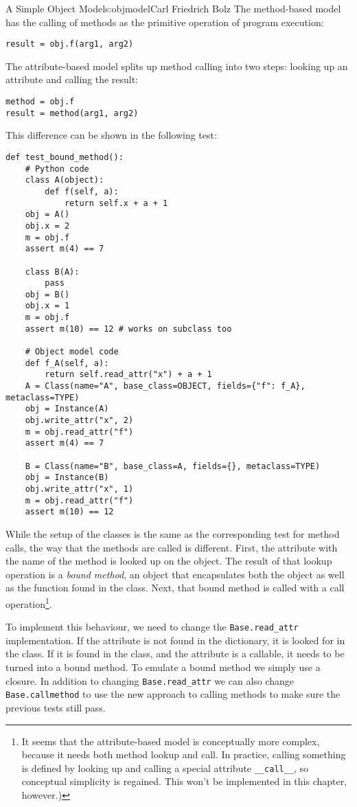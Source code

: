 \begin{aosachapter}{A Simple Object Model}{s:objmodel}{Carl Friedrich Bolz}
The method-based model has the calling of methods as the primitive
operation of program execution:

\begin{verbatim}
result = obj.f(arg1, arg2)
\end{verbatim}

The attribute-based model splits up method calling into two steps:
looking up an attribute and calling the result:

\begin{verbatim}
method = obj.f
result = method(arg1, arg2)
\end{verbatim}

This difference can be shown in the following test:

\begin{verbatim}
def test_bound_method():
    # Python code
    class A(object):
        def f(self, a):
            return self.x + a + 1
    obj = A()
    obj.x = 2
    m = obj.f
    assert m(4) == 7

    class B(A):
        pass
    obj = B()
    obj.x = 1
    m = obj.f
    assert m(10) == 12 # works on subclass too

    # Object model code
    def f_A(self, a):
        return self.read_attr("x") + a + 1
    A = Class(name="A", base_class=OBJECT, fields={"f": f_A}, metaclass=TYPE)
    obj = Instance(A)
    obj.write_attr("x", 2)
    m = obj.read_attr("f")
    assert m(4) == 7

    B = Class(name="B", base_class=A, fields={}, metaclass=TYPE)
    obj = Instance(B)
    obj.write_attr("x", 1)
    m = obj.read_attr("f")
    assert m(10) == 12
\end{verbatim}

While the setup of the classes is the same as the corresponding test for
method calls, the way that the methods are called is different. First,
the attribute with the name of the method is looked up on the object.
The result of that lookup operation is a \emph{bound method}, an object
that encapsulates both the object as well as the function found in the
class. Next, that bound method is called with a call operation\footnote{It
  seems that the attribute-based model is conceptually more complex,
  because it needs both method lookup and call. In practice, calling
  something is defined by looking up and calling a special attribute
  \texttt{\_\_call\_\_}, so conceptual simplicity is regained. This
  won't be implemented in this chapter, however.)}.

To implement this behaviour, we need to change the
\texttt{Base.read\_attr} implementation. If the attribute is not found
in the dictionary, it is looked for in the class. If it is found in the
class, and the attribute is a callable, it needs to be turned into a
bound method. To emulate a bound method we simply use a closure. In
addition to changing \texttt{Base.read\_attr} we can also change
\texttt{Base.callmethod} to use the new approach to calling methods to
make sure the previous tests still pass.


\end{aosachapter}
